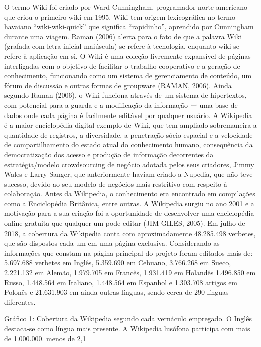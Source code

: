 O termo Wiki foi criado por Ward Cunningham, programador norte-americano que criou o primeiro wiki em 1995. Wiki tem origem lexicográfica no termo havaiano “wiki-wiki-quick” que significa “rapidinho”, aprendido por Cunningham durante uma viagem. Raman (2006) alerta para o fato de que a palavra Wiki (grafada com letra inicial maiúscula) se refere à tecnologia, enquanto wiki se refere à aplicação em si. 
O Wiki é uma coleção livremente expansível de páginas interligadas com o objetivo de facilitar o trabalho cooperativo e a geração de conhecimento, funcionando como um sistema de gerenciamento de conteúdo, um fórum de discussão e outras formas de groupware (RAMAN, 2006). 
Ainda segundo Raman (2006), o Wiki funciona através de um sistema de hipertextos, com potencial para a guarda e a modificação da informação ー uma base de dados onde cada página é facilmente editável por qualquer usuário.
A Wikipedia é a maior enciclopédia digital exemplo de Wiki, que tem ampliado sobremaneira a quantidade de registros, a diversidade, a penetração sócio-espacial e a velocidade de compartilhamento do estado atual do conhecimento humano, consequência da democratização dos acesso e produção de informação decorrentes da estratégia/modelo crowdsourcing de negócio adotada pelos seus criadores, Jimmy Wales e Larry Sanger, que anteriormente haviam criado a Nupedia, que não teve sucesso, devido ao seu modelo de negócios mais restritivo com respeito à colaboração.
Antes da Wikipedia, o conhecimento era encontrado em compilações como a Enciclopédia Britânica, entre outras. A Wikipedia surgiu no ano 2001 e a motivação para a sua criação foi a oportunidade de desenvolver uma enciclopédia online gratuita que qualquer um pode editar (JIM GILES, 2005). 
Em julho de 2018, a cobertura da Wikipedia conta com aproximadamente 48.285.498 verbetes, que são dispostos cada um em uma página exclusiva. Considerando as informações que constam na página principal do projeto foram editados mais de: 5.697.688 verbetes em Inglês, 5.359.690 em Cebuano, 3.766.268 em Sueco, 2.221.132 em Alemão, 1.979.705 em Francês,  1.931.419 em Holandês 1.496.850 em Russo, 1.448.564 em Italiano, 1.448.564 em Espanhol e 1.303.708 artigos em Polonês e 21.631.903 em ainda outras línguas, sendo cerca de 290 línguas diferentes.

Gráfico 1: Cobertura da Wikipedia segundo cada vernáculo empregado. O Inglês destaca-se como língua mais presente. A Wikipedia lusófona participa com mais de 1.000.000. menos de 2,1%

